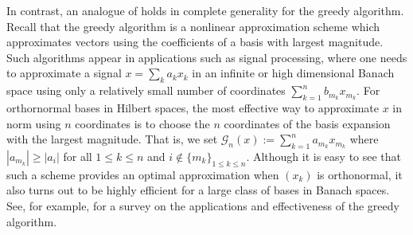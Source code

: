 \documentclass[12pt,leqno]{amsart}
\numberwithin{equation}{section}
\theoremstyle{definition}
\begin{document}
In contrast,  an analogue of  holds in complete generality  for the  greedy algorithm. Recall that the greedy algorithm is a nonlinear approximation scheme which approximates vectors using the coefficients of a basis with largest magnitude. Such algorithms appear  in applications such as signal processing, where one needs to approximate a signal $x=\sum_k a_k x_k$ in an infinite or high dimensional Banach space using only a relatively small number of coordinates $\sum_{k=1}^n b_{m_k} x_{m_k}$.  For orthornormal bases in Hilbert spaces, the most effective  way to approximate $x$ in norm using $n$ coordinates is to choose the $n$ coordinates of the basis expansion with the largest magnitude.  That is,  we set $\mathcal{G}_n(x) := \sum_{k=1}^n a_{m_k} x_{m_k}$ where $|a_{m_k}|\geq |a_i|$ for all $1\leq k\leq n$ and $i\not\in\{m_k\}_{1\leq k\leq n}$. Although it is easy to see that such a scheme provides an optimal  approximation  when $(x_k)$ is orthonormal, it also turns out to be  highly efficient for a large class of bases in Banach spaces. See, for example, \cite{MR2848161} for a survey on the applications and  effectiveness of the greedy algorithm. 
\medskip
\end{document}
